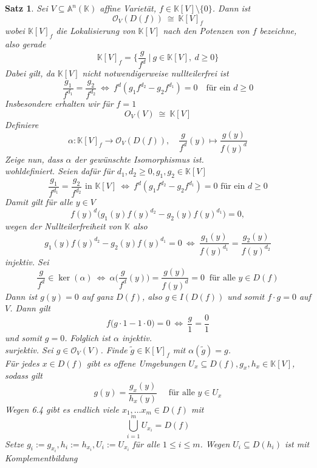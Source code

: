 \documentclass[11pt]{book}
\newtheorem{theorem}{Satz}[section]
\theoremstyle{nonumberbreak}
\newenvironment{pr}[1][]{\ifthenelse{\equal{#1}{}}{\proof}{\proof[#1]}\rm}{\endproof}
\begin{document}
\begin{spacing}{1.3}
\begin{theorem} %
Sei $V\subseteq \mathbb{A}^n(\mathbb{K})$ affine Varietät, $f \in \mathbb{K}[V] \setminus\{0\}$. Dann ist 
$$\mathcal{O}_V\left(D(f)\right) \ \cong \ \mathbb{K}[V]_f$$
wobei $\mathbb{K}[V]_f$ die Lokalisierung von $\mathbb{K}[V]$ nach den Potenzen von $f$ bezeichne, also gerade
$$\mathbb{K}[V]_f =\bigg\{ \frac{g}{f^d} \ \big\vert \ g \in \mathbb{K}[V], \ d \geqslant 0 \bigg\}$$
Dabei gilt, da $\mathbb{K}[V]$ nicht notwendigerweise nullteilerfrei ist
$$\frac{g_1}{f^{d_1}} = \frac{g_2}{f^{d_2}} \ \Longleftrightarrow \ f^d \left( g_1 f^{d_2} - g_2 f^{d_1}\right)=0 \quad \textrm{für ein } d \geqslant 0$$
Insbesondere erhalten wir für $f=1$
$$O_V(V) \ \cong \ \mathbb{K}[V]$$
\begin{pr}
Definiere
$$\alpha: \mathbb{K}[V]_f \longrightarrow \mathcal{O}_V\left(D(f)\right), \quad \frac{g}{f^d}(y) \mapsto \frac{g(y)}{f(y)^d}$$
Zeige nun, dass $\alpha$ der gewünschte Isomorphismus ist.\\
\textit{wohldefiniert.} Seien dafür für $d_1, d_2 \geqslant 0, g_1, g_2 \in \mathbb{K}[V]$
$$\frac{g_1}{f^{d_1}} = \frac{g_2}{f^{d_2}} \textrm{ in } \mathbb{K}[V] \ \Longleftrightarrow \ f^d \left(g_1 f^{d_2} - g_2 f^{d_1}\right)=0 \textrm{ für ein } d\geqslant 0$$
Damit gilt für alle $y\in V$
$$f(y)^d \big( g_1(y) f(y)^{d_2} - g_2(y) f(y)^{d_1}\big) = 0,$$
wegen der Nullteilerfreiheit von $\mathbb{K}$ also 
$$g_1(y)f(y)^{d_2} - g_2(y)f(y)^{d_1} = 0 \ \Longleftrightarrow \ \frac{g_1(y)}{f(y)^{d_1}} = \frac{g_2(y)}{f(y)^{d_2}}$$
\textit{injektiv.} Sei
$$\frac{g}{f^d} \in \ker(\alpha) \ \Longleftrightarrow \ \alpha\bigg(\frac{g}{f^d}(y)\bigg) = \frac{g(y)}{f(y)^d} = 0 \ \textrm{ für alle } y \in D(f)$$
Dann ist $g(y)=0$ auf ganz $D(f)$, also $g \in I(D(f))$ und somit $f \cdot g=0$ auf $V$. Dann gilt
$$f \big(g \cdot 1 - 1 \cdot 0 \big)=0 \ \Longleftrightarrow \ \frac{g}{1} = \frac{0}{1}$$
und somit $g =0$. Folglich ist $\alpha$ injektiv.\\
\textit{surjektiv.} Sei $g \in \mathcal{O}_V(V)$. Finde $\tilde{g} \in \mathbb{K}[V]_f$ mit $\alpha(\tilde{g})=g$.\\
Für jedes $x \in D(f)$ gibt es offene Umgebungen $U_x \subseteq D(f), g_x, h_x \in \mathbb{K}[V]$, sodass gilt
$$g(y)= \frac{g_x(y)}{h_x(y)} \quad \textrm{ für alle } y \in U_x$$
Wegen 6.4 gibt es endlich viele $x_1, \dots x_m \in D(f)$ mit 
$$\bigcup_{i=1}^m U_{x_i} = D(f)$$
Setze $g_i:=g_{x_i}, h_i := h_{x_i}, U_i:=U_{x_i}$ für alle $1 \leqslant i \leqslant m$. Wegen $U_i \subseteq D(h_i)$ ist mit Komplementbildung

\end{pr}
\end{theorem}
\end{spacing}
\end{document}
